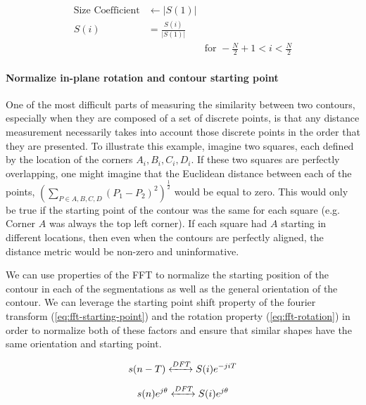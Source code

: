 \begin{equation}
    \begin{aligned}
        \text{Size Coefficient} &\leftarrow |S(1)| \\
        S(i) &= \frac{S(i)}{|S(1)|} & \\
        & & \text{for } -\frac{N}{2} + 1 < i < \frac{N}{2}
    \end{aligned}
\end{equation}


\paragraph*{Normalize in-plane rotation and contour starting point}

One of the most difficult parts of measuring the similarity between two contours, especially when they are composed of a set of discrete points, is that any distance measurement necessarily takes into account those discrete points in the order that they are presented. To illustrate this example, imagine two squares, each defined by the location of the corners $A_i,B_i,C_i,D_i$. If these two squares are perfectly overlapping, one might imagine that the Euclidean distance between each of the points, $(\sum_{P \in A,B,C,D} (P_1 - P_2)^2)^{\frac{1}{2}}$ would be equal to zero. This would only be true if the starting point of the contour was the same for each square (e.g. Corner $A$ was always the top left corner). If each square had $A$ starting in different locations, then even when the contours are perfectly aligned, the distance metric would be non-zero and uninformative. 

We can use properties of the FFT to normalize the starting position of the contour in each of the segmentations as well as the general orientation of the contour. We can leverage the starting point shift property of the fourier transform (\cref{eq:fft-starting-point}) and the rotation property (\cref{eq:fft-rotation}) in order to normalize both of these factors and ensure that similar shapes have the same orientation and starting point. 

\begin{equation}
    s(n-T) \xleftrightarrow[]{DFT} S(i)e^{-jiT}
    \label{eq:fft-starting-point}
\end{equation}

\begin{equation}
    s(n)e^{j\theta} \xleftrightarrow[]{DFT} S(i)e^{j\theta}
    \label{eq:fft-rotation}
\end{equation}

